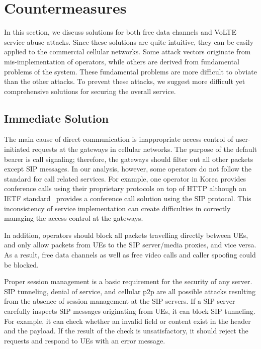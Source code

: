\chapter{Countermeasures}
\label{sec:cm}
In this section, we discuss solutions for both free data channels and VoLTE
service abuse attacks. Since these solutions are quite intuitive, they can be
easily applied to the commercial cellular networks.
Some attack vectors originate from mis-implementation of operators,
while others are derived from fundamental problems of the \vt system.
These fundamental problems are more difficult to obviate than the other attacks.
To prevent these attacks, we suggest more difficult yet comprehensive solutions for securing
the overall \vt service.


\section{Immediate Solution}
The main cause of direct communication is inappropriate access control of
user-initiated requests at the gateways in cellular networks. The purpose of the
\vt default bearer is call signaling; therefore, the gateways should filter out
all other packets except SIP messages.  In our analysis, however, some operators
do not follow the standard for call related services.  For example, one operator
in Korea provides conference calls using their proprietary protocols on top of
HTTP although an IETF standard~\cite{johnston2006session} provides a conference
call solution using the SIP protocol.  This inconsistency of service
implementation can create difficulties in correctly managing the access control
at the gateways.

In addition, operators should block all packets travelling directly between UEs,
and only allow packets from UEs to the SIP server/media proxies, and vice versa.
As a result, free data channels as well as free video calls and caller spoofing
could be blocked.

Proper session management is a basic requirement for the security of any server.
SIP tunneling, denial of service, and cellular p2p are all possible attacks
resulting from the absence of session management at the SIP servers.
If a SIP server carefully inspects SIP messages originating from UEs, it can
block SIP tunneling.  For example, it can check whether an invalid field or
content exist in the header and the payload. If the result of the check is
unsatisfactory, it should reject the requests and respond to UEs with an error
message.

